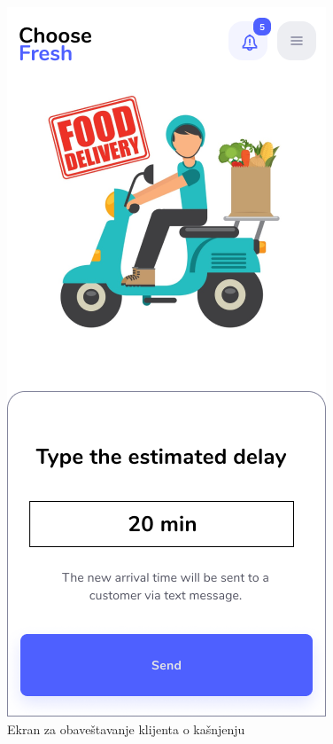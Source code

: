 \begin{figure}[H]
	\begin{center}
		\includegraphics[scale=0.3]{UI/deliveryman_delay_input.png}
    		\caption{Ekran za obaveštavanje klijenta o kašnjenju}
    \label{fig:DeliverymanDelay}
    \end{center}
\end{figure}

